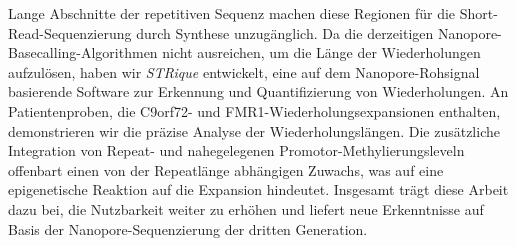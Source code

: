 Lange Abschnitte der repetitiven Sequenz machen diese Regionen für die Short-Read-Sequenzierung durch Synthese unzugänglich.
Da die derzeitigen Nanopore-Basecalling-Algorithmen nicht ausreichen, um die Länge der Wiederholungen aufzulösen, haben wir \textit{STRique} entwickelt, eine auf dem Nanopore-Rohsignal basierende Software zur Erkennung und Quantifizierung von Wiederholungen.
An Patientenproben, die C9orf72- und FMR1-Wiederholungsexpansionen enthalten, demonstrieren wir die präzise Analyse der Wiederholungslängen.
Die zusätzliche Integration von Repeat- und nahegelegenen Promotor-Methylierungsleveln offenbart einen von der Repeatlänge abhängigen Zuwachs, was auf eine epigenetische Reaktion auf die Expansion hindeutet.
Insgesamt trägt diese Arbeit dazu bei, die Nutzbarkeit weiter zu erhöhen und liefert neue Erkenntnisse auf Basis der Nanopore-Sequenzierung der dritten Generation.


